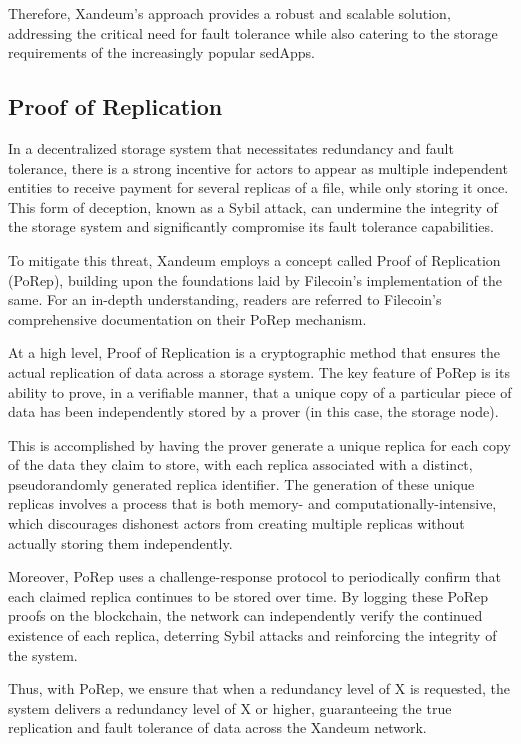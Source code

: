\documentclass[11pt]{article}   	%
\begin{document}
Therefore, Xandeum's approach provides a robust and scalable solution, addressing the critical need for fault tolerance while also catering to the storage requirements of the increasingly popular sedApps.

\subsection{Proof of Replication}
In a decentralized storage system that necessitates redundancy and fault tolerance, there is a strong incentive for actors to appear as multiple independent entities to receive payment for several replicas of a file, while only storing it once. This form of deception, known as a Sybil attack, can undermine the integrity of the storage system and significantly compromise its fault tolerance capabilities.

To mitigate this threat, Xandeum employs a concept called Proof of Replication (PoRep), building upon the foundations laid by Filecoin's implementation of the same. For an in-depth understanding, readers are referred to Filecoin's comprehensive documentation on their PoRep mechanism.

At a high level, Proof of Replication is a cryptographic method that ensures the actual replication of data across a storage system. The key feature of PoRep is its ability to prove, in a verifiable manner, that a unique copy of a particular piece of data has been independently stored by a prover (in this case, the storage node).

This is accomplished by having the prover generate a unique replica for each copy of the data they claim to store, with each replica associated with a distinct, pseudorandomly generated replica identifier. The generation of these unique replicas involves a process that is both memory- and computationally-intensive, which discourages dishonest actors from creating multiple replicas without actually storing them independently.

Moreover, PoRep uses a challenge-response protocol to periodically confirm that each claimed replica continues to be stored over time. By logging these PoRep proofs on the blockchain, the network can independently verify the continued existence of each replica, deterring Sybil attacks and reinforcing the integrity of the system.

Thus, with PoRep, we ensure that when a redundancy level of X is requested, the system delivers a redundancy level of X or higher, guaranteeing the true replication and fault tolerance of data across the Xandeum network.
\end{document}
